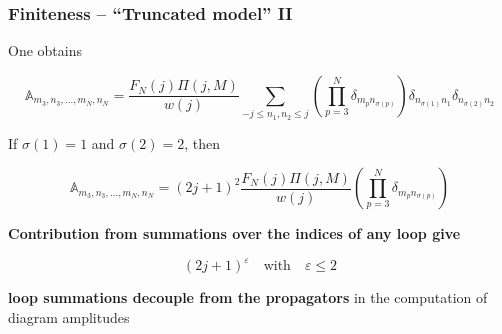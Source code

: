\documentclass[9pt]{beamer}
\begin{document}
\begin{frame}
\frametitle{Finiteness -- ``Truncated model'' II}

One obtains

\begin{block}{}
\vspace*{-3pt}
\begin{equation*}
\mathbb{A}_{m_3,n_3,...,m_N,n_N}=\frac{F_N(j)\Pi(j,M)}{w(j)}\sum_{-j\le n_1,n_2\le j}\left(\prod_{p=3}^N \delta_{m_pn_{\sigma(p)}}\right)\delta_{n_{\sigma(1)}n_1}\delta_{n_{\sigma(2)}n_2}
\end{equation*}
 
\end{block}

\vspace*{4pt}

If $\sigma(1)=1$ and $\sigma(2)=2$, then 

\begin{equation*}
\mathbb{A}_{m_3,n_3,...,m_N,n_N}=(2j+1)^2\frac{F_N(j)\Pi(j,M)}{w(j)}\left(\prod_{p=3}^N \delta_{m_pn_{\sigma(p)}}\right)
\end{equation*}

\textbf{Contribution from summations over the indices of any loop give} 

\begin{equation*}
(2j+1)^\varepsilon \quad \mbox{with} \quad \varepsilon\leq2 
\end{equation*}

\textdbend \quad \textbf{loop summations decouple from the propagators} in the computation of diagram amplitudes 

\end{frame}

\end{document}

